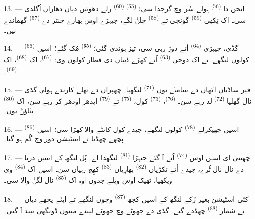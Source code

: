 13. --- انجن دا  \textsuperscript{(56)} ہولے سُر وچ گرجدا سی؛
 \textsuperscript{(55)}  \textsuperscript{(60)} رلے دھوئیں
دیاں دھاراں اُگلدی سی۔ اک تِکھی  \textsuperscript{(59)} گونجی تے
 \textsuperscript{(58)} چلݨ لگے، جیہڑے اوس بھارے جنتر دے 
\textsuperscript{(57)} گھماندے نیں۔

\VUsaut{3.0mm}
\VUsaut{3.0mm}

14. --- گڈی، جیہڑی  \textsuperscript{(64)} اُتے دوڑ رہی سی، تیز ہوندی
گئی؛  \textsuperscript{(65)} مُک گئے؛ اسیں 
\textsuperscript{(66)} کولوں لنگھے، تے اک دوجی  \textsuperscript{(63)}
اُتے کھڑے ڈبیاں دی قطار کولوں وی:  \textsuperscript{(67)}، اک
 \textsuperscript{(68)}، اک 
\textsuperscript{(69)}۔


15. --- فیر ساڈیاں اکھاں دے سامݨے توں  \textsuperscript{(71)}
لنگھیا۔ چھپراں دے تھلے کارندے ہولی گڈی نال گھلیا  \textsuperscript{(72)}
لد رہے سن۔  \textsuperscript{(76)}، 
\textsuperscript{(73)} کول،  \textsuperscript{(75)} تے
 \textsuperscript{(79)} ایدھر اودھر کر رہے سن، اک 
\textsuperscript{(80)} بݨاؤݨ نوں۔

16. --- اسیں چھیکرلے  \textsuperscript{(78)} کولوں لنگھے، جیدے کول
کانٹے والا کھڑا سی؛ اسیں  \textsuperscript{(86)} پچھے چھڈیا تے
اسٹیشن دور وچ گُم ہو گیا۔

17. --- چھیتی ای اسیں اوس  \textsuperscript{(74)} اُتے آ گئے
جیہڑا  \textsuperscript{(81)} لنگھدا اے۔ پُل لنگھ کے اسیں دریا دے نال
نال ٹُرے، جیدے اُتے تکڑیاں  \textsuperscript{(82)}
بھارِیاں  \textsuperscript{(83)} کھِچ رہیاں سن۔ اسیں اک
 \textsuperscript{(84)} وی ویکھیا، ٹھیک اوس ویلے جدوں اوہ اک
 \textsuperscript{(85)} نال لگݨ والا سی۔

18. --- کئی اسٹیشن بغیر رُکے لنگھ کے اسیں کجھ  \textsuperscript{(87)}
وچوں لنگھے تے اپݨے پچھے  دیاں بے شمار 
\textsuperscript{(88)} چھڈدے گئے۔ گڈی دے جھوٹے وچ جھوٹے لیندے مینوں ڈونگھی نیند آ
گئی۔

